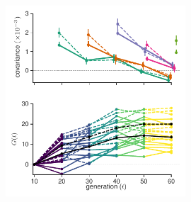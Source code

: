 \documentclass[11pt]{article}
\begin{document}
{%

\begin{figure}[!ht]
  \centering
  \includegraphics[width=0.6\textwidth]{figures/figure-1-G-covs-nofix.pdf}


\end{figure}}
\end{document}
